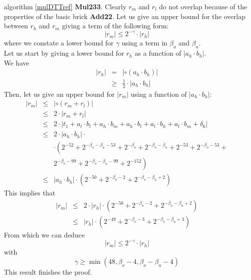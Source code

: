\documentclass[a4paper,10pt,twoside]{article}
\newenvironment{proof}[1][Proof]{\begin{trivlist}
\item[\hskip \labelsep {\bfseries #1}]}{\end{trivlist}}
\newcommand{\qed}{\nobreak \ifvmode \relax \else \ifdim \lastskip<1.5em \hskip-\lastskip
\hskip1.5em plus0em minus0.5em \fi \nobreak \vrule height0.75em width0.5em depth0.25em\fi}
\newcommand{\hi}{\ensuremath{\mathit{h}}}
\newcommand{\mi}{\ensuremath{\mathit{m}}}
\newcommand{\lo}{\ensuremath{\mathit{l}}}
\newcommand{\AddDD}{{\bf Add22}}
\newcommand{\MulDTT}{{\bf Mul233}}
\begin{document}
\begin{proof}
algorithm \ref{mulDTTref} \MulDTT.
Clearly $r_\mi$ and $r_\lo$ do not overlap because of the properties of the basic brick \AddDD.
Let us give an upper bound for the overlap between $r_\hi$ and $r_\mi$ giving a term of the following form: 
$$\left \vert r_\mi \right \vert \leq 2^{-\gamma} \cdot \left \vert r_\hi \right \vert$$
where we constate a lower bound for $\gamma$ using a term in $\beta_o$ and $\beta_u$.\\
Let us start by giving a lower bound for $r_\hi$ as a function of $\left \vert a_\hi \cdot b_\hi \right \vert$.\\ We have
\begin{eqnarray*}
\left \vert r_\hi \right \vert & = & \left \vert \circ \left( a_\hi \cdot b_\hi \right) \right \vert \\
& \geq & \frac{1}{2} \cdot \left \vert a_\hi \cdot b_\hi \right \vert
\end{eqnarray*}
Then, let us give an upper bound for $\left \vert r_\mi \right \vert$ using a function of 
$\left \vert a_\hi \cdot b_\hi \right \vert$:
\begin{eqnarray*}
\left \vert r_\mi \right \vert & \leq & \left \vert \circ \left( r_\mi + r_\lo \right) \right \vert \\
& \leq & 2 \cdot \left \vert r_\mi + r_\lo \right \vert \\
& \leq & 
2 \cdot \left \vert t_1 + a_\lo \cdot b_\lo + a_\hi \cdot b_\mi + a_\hi \cdot b_\lo + a_\lo \cdot b_\hi + a_\lo \cdot b_\mi + \delta_6 \right \vert \\
& \leq & 2 \cdot \left \vert a_\hi \cdot b_\hi \right \vert \cdot \\
& & \cdot \left( 
2^{-52} + 
2^{-\beta_o-\beta_u-53} + 
2^{-\beta_o} + 
2^{-\beta_o-\beta_u} + 
2^{-53} + 
2^{-\beta_o-53} +  \right. \\ & & \left. 
2^{-\beta_o-99} + 
2^{-\beta_o-\beta_u-99} + 
2^{-152} \right) \\
& \leq & \left \vert a_\hi \cdot b_\hi \right \vert
\cdot \left( 
2^{-50} + 
2^{-\beta_o-2} + 
2^{-\beta_o-\beta_u+2} \right)
\end{eqnarray*}
This implies that 
\begin{eqnarray*}
\left \vert r_\mi \right \vert & \leq & 2 \cdot \left \vert r_\hi \right \vert \cdot \left( 
2^{-50} + 
2^{-\beta_o-2} + 
2^{-\beta_o-\beta_u+2} \right) \\
& \leq & \left \vert r_\hi \right \vert \cdot \left( 
2^{-49} + 
2^{-\beta_o-3} + 
2^{-\beta_o-\beta_u+3} \right)
\end{eqnarray*}
From which we can deduce 
$$\left \vert r_\mi \right \vert \leq 2^{-\gamma} \cdot \left \vert r_\hi \right \vert$$
with
$$\gamma \geq \min \left( 48, \beta_o - 4, \beta_o -\beta_u -4 \right)$$
This result finishes the proof.\qed
\end{proof}
\end{document}
